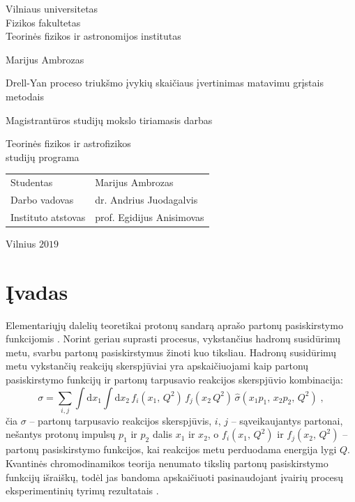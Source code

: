 \documentclass[a4paper, 12pt, oneside]{article}
\newlength\q
\begin{document}

\begin{titlepage}
\centering
{\large Vilniaus universitetas \\ Fizikos fakultetas \\ Teorinės fizikos ir astronomijos institutas \par}
\vspace{3.5cm}
{\Large Marijus Ambrozas \par}
\vspace{0.3cm}
{\Large Drell-Yan proceso triukšmo įvykių skaičiaus įvertinimas matavimu grįstais metodais \par}
\vspace{0.8cm}
{\large Magistrantūros studijų mokslo tiriamasis darbas \par}
\vspace{0.8cm}
{\large Teorinės fizikos ir astrofizikos \\ studijų programa \par}
\vspace{3.5cm}
{\large \begin{tabular*}{0.9\textwidth}{@{\extracolsep{\fill}}ll}
Studentas & Marijus Ambrozas\tabularnewline[0.5cm]
Darbo vadovas & dr. Andrius Juodagalvis\tabularnewline[0.5cm]
Instituto atstovas & prof. Egidijus Anisimovas\tabularnewline[0.5cm]
\end{tabular*} \par}
\vspace{4cm}
{\large Vilnius $2019$\par}
\end{titlepage}


\clearpage
\tableofcontents
\clearpage

\section*{Įvadas} 

Elementariųjų dalelių teoretikai protonų sandarą aprašo partonų pasiskirstymo funkcijomis \cite{NNPDF}.
Norint geriau suprasti procesus, vykstančius hadronų susidūrimų metu, svarbu partonų pasiskirstymus žinoti kuo tiksliau.
Hadronų susidūrimų metu vykstančių reakcijų skerspjūviai yra apskaičiuojami kaip partonų pasiskirstymo
funkcijų ir partonų tarpusavio reakcijos skerspjūvio kombinacija:
\begin{equation}
	\sigma = \sum_{i, j} \int \mathrm{d}x_1 \int \mathrm{d}x_2 \,
	f_{i}(x_1, \, Q^2) \, f_{j}(x_2 \, Q^2) \, \hat{\sigma}(x_1 p_1, \, x_2 p_2, \, Q^2) \; \mathrm{,}
	\label{eq:PDFxsec}
\end{equation}
čia $\sigma$ -- partonų tarpusavio reakcijos skerspjūvis, $i$, $j$ -- sąveikaujantys partonai, nešantys protonų impulsų $p_1$ ir $p_2$
dalis $x_1$ ir $x_2$, o $f_{i}(x_1, \, Q^2)$ ir $f_{j}(x_2, \, Q^2)$ -- partonų pasiskirstymo funkcijos, kai
reakcijos metu perduodama energija lygi $Q$.
Kvantinės chromodinamikos teorija nenumato tikslių partonų pasiskirstymo funkcijų išraiškų, todėl jas bandoma
apskaičiuoti pasinaudojant įvairių procesų eksperimentinių tyrimų rezultatais \cite{NNPDF, PDF_CTEQ, PDF_ABMP16}.
\end{document}

